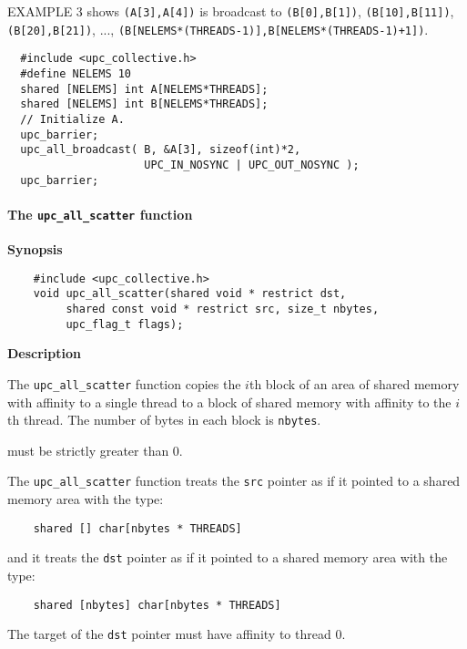 \np EXAMPLE 3 shows {\tt (A[3],A[4])} is broadcast to
{\tt (B[0],B[1])}, {\tt (B[10],B[11])}, \\
{\tt (B[20],B[21])}, ..., 
{\tt (B[NELEMS*(THREADS-1)],B[NELEMS*(THREADS-1)+1])}.
\begin{verbatim}
  #include <upc_collective.h>
  #define NELEMS 10
  shared [NELEMS] int A[NELEMS*THREADS];
  shared [NELEMS] int B[NELEMS*THREADS];
  // Initialize A.
  upc_barrier;
  upc_all_broadcast( B, &A[3], sizeof(int)*2,
                     UPC_IN_NOSYNC | UPC_OUT_NOSYNC );
  upc_barrier;
\end{verbatim}

\paragraph{The {\tt upc\_all\_scatter} function}

{\bf Synopsis} 

\npf\vspace{-2.5em}
\begin{verbatim}
    #include <upc_collective.h>
    void upc_all_scatter(shared void * restrict dst, 
         shared const void * restrict src, size_t nbytes, 
         upc_flag_t flags);
\end{verbatim}

{\bf Description} 

\np The {\tt upc\_all\_scatter} function copies the $i$th block of an
area of shared memory with affinity to a single thread
to a block of shared memory with affinity to the $i$th thread.
The number of bytes in each block is {\tt nbytes}.

 must be strictly greater than 0.

\np The {\tt upc\_all\_scatter} function treats the {\tt src} pointer
as if it pointed to a shared memory area with the type:

\begin{verbatim}
    shared [] char[nbytes * THREADS]
\end{verbatim}  

\np and it treats the {\tt dst} pointer as if it pointed to a shared
memory area with the type:

\begin{verbatim}
    shared [nbytes] char[nbytes * THREADS]
\end{verbatim}  

\np The target of the {\tt dst} pointer must have affinity to thread 0.


